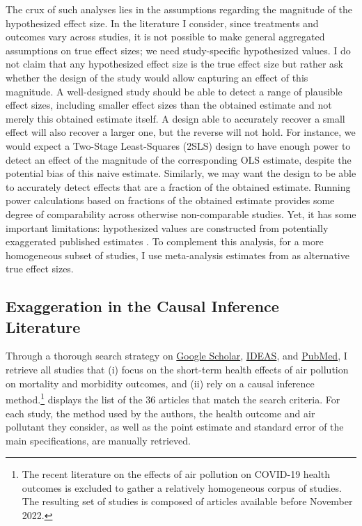\documentclass[12pt]{article}
\begin{document}
		The crux of such analyses lies in the assumptions regarding the magnitude of the hypothesized effect size. In the literature I consider, since treatments and outcomes vary across studies, it is not possible to make general aggregated assumptions on true effect sizes; we need study-specific hypothesized values. I do not claim that any hypothesized effect size is the true effect size but rather ask whether the design of the study would allow capturing an effect of this magnitude. A well-designed study should be able to detect a range of plausible effect sizes, including smaller effect sizes than the obtained estimate and not merely this obtained estimate itself. A design able to accurately recover a small effect will also recover a larger one, but the reverse will not hold. For instance, we would expect a Two-Stage Least-Squares (2SLS) design to have enough power to detect an effect of the magnitude of the corresponding OLS estimate, despite the potential bias of this naive estimate. Similarly, we may want the design to be able to accurately detect effects that are a fraction of the obtained estimate. Running power calculations based on fractions of the obtained estimate provides some degree of comparability across otherwise non-comparable studies. Yet, it has some important limitations: hypothesized values are constructed from potentially exaggerated published estimates \citep{gelman_beyond_2014}. To complement this analysis, for a more homogeneous subset of studies, I use meta-analysis estimates from \cite{shah_short_2015} as alternative true effect sizes. 
		
	\subsection{Exaggeration in the Causal Inference Literature}
        
		Through a thorough search strategy on \href{https://scholar.google.com/}{Google Scholar}, \href{https://ideas.repec.org/}{IDEAS}, and \href{https://pubmed.ncbi.nlm.nih.gov/}{PubMed}, I retrieve all studies that (i) focus on the short-term health effects of air pollution on mortality and morbidity outcomes, and (ii) rely on a causal inference method.\footnote{The recent literature on the effects of air pollution on COVID-19 health outcomes is excluded to gather a relatively homogeneous corpus of studies. The resulting set of studies is composed of articles available before November 2022.}  displays the list of the 36 articles that match the search criteria. For each study, the method used by the authors, the health outcome and air pollutant they consider, as well as the point estimate and standard error of the main specifications, are manually retrieved.%
        
\end{document}
